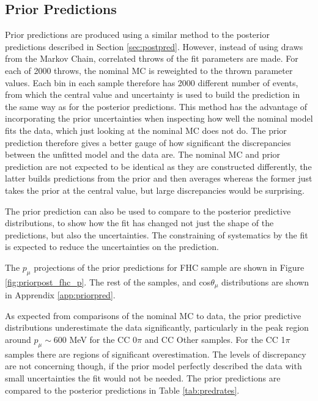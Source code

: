 \subsection{Prior Predictions}

Prior predictions are produced using a similar method to the posterior predictions described in Section \ref{sec:postpred}. However, instead of using draws from the Markov Chain, correlated throws of the fit parameters are made. For each of 2000 throws, the nominal MC is reweighted to the thrown parameter values. Each bin in each sample therefore has 2000 different number of events, from which the central value and uncertainty is used to build the prediction in the same way as for the posterior predictions. This method has the advantage of incorporating the prior uncertainties when inspecting how well the nominal model fits the data, which just looking at the nominal MC does not do. The prior prediction therefore gives a better gauge of how significant the discrepancies between the unfitted model and the data are. The nominal MC and prior prediction are not expected to be identical as they are constructed differently, the latter builds predictions from the prior and then averages whereas the former just takes the prior at the central value, but large discrepancies would be surprising.

The prior prediction can also be used to compare to the posterior predictive distributions, to show how the fit has changed not just the shape of the predictions, but also the uncertainties. The constraining of systematics by the fit is expected to reduce the uncertainties on the prediction.

The $p_{\mu}$ projections of the prior predictions for FHC sample are shown in Figure \ref{fig:priorpost_fhc_p}. The rest of the samples, and cos$\theta_{\mu}$ distributions are shown in Apprendix \ref{app:priorpred}.

As expected from comparisons of the nominal MC to data, the prior predictive distributions underestimate the data significantly, particularly in the peak region around $p_{\mu} \sim$600 MeV for the CC 0$\pi$ and CC Other samples. For the CC 1$\pi$ samples there are regions of significant overestimation. The levels of discrepancy are not concerning though, if the prior model perfectly described the data with small uncertainties the fit would not be needed. The prior predictions are compared to the posterior predictions in Table \ref{tab:predrates}.

